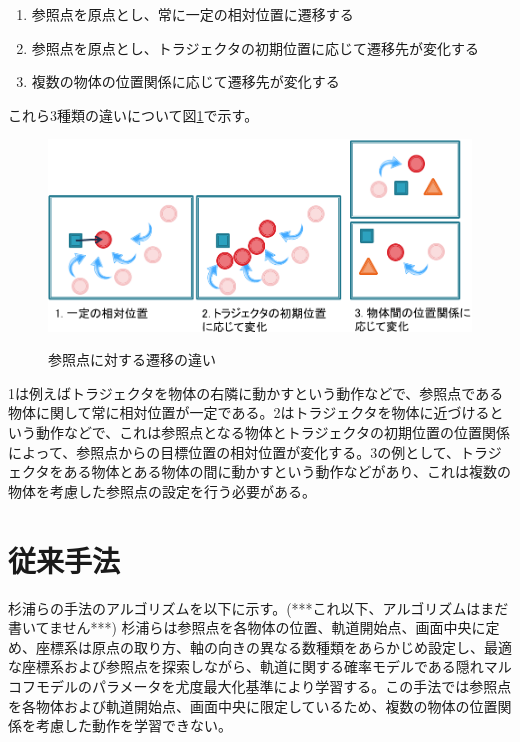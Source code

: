 	\begin{enumerate}
		\item 参照点を原点とし、常に一定の相対位置に遷移する
		\item 参照点を原点とし、トラジェクタの初期位置に応じて遷移先が変化する
		\item 複数の物体の位置関係に応じて遷移先が変化する
	\end{enumerate}
これら3種類の違いについて図\ref{figure:difference_displacement}で示す。
	\begin{figure}[t]
		\begin{center}
			\includegraphics[width=14cm]{figure2.png} \\ %
			\caption{参照点に対する遷移の違い}
			\label{figure:difference_displacement}
		\end{center}
	\end{figure}
1は例えばトラジェクタを物体の右隣に動かすという動作などで、参照点である物体に関して常に相対位置が一定である。2はトラジェクタを物体に近づけるという動作などで、これは参照点となる物体とトラジェクタの初期位置の位置関係によって、参照点からの目標位置の相対位置が変化する。3の例として、トラジェクタをある物体とある物体の間に動かすという動作などがあり、これは複数の物体を考慮した参照点の設定を行う必要がある。

\section{従来手法}

杉浦ら\cite{sugiura}の手法のアルゴリズムを以下に示す。(***これ以下、アルゴリズムはまだ書いてません***)
杉浦らは参照点を各物体の位置、軌道開始点、画面中央に定め、座標系は原点の取り方、軸の向きの異なる数種類をあらかじめ設定し、最適な座標系および参照点を探索しながら、軌道に関する確率モデルである隠れマルコフモデルのパラメータを尤度最大化基準により学習する。この手法では参照点を各物体および軌道開始点、画面中央に限定しているため、複数の物体の位置関係を考慮した動作を学習できない。

